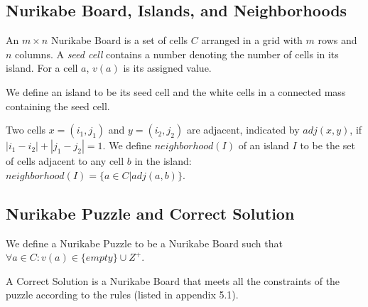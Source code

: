 \documentclass{article}
\theoremstyle{definition}
\begin{document}
\subsection{Nurikabe Board, Islands, and Neighborhoods}
An $m \times n$ Nurikabe Board is a set of cells $C$ arranged in a grid with $m$ rows and $n$ columns. A \textit{seed cell} contains a number denoting the number of cells in its island. For a cell $a$, $v(a)$ is its assigned value.

We define an island to be its seed cell and the white cells in a connected mass containing the seed cell.

Two cells $x=(i_1, j_1)$ and $y=(i_2, j_2)$ are adjacent, indicated by $adj(x, y)$, if $|i_1-i_2|+|j_1-j_2|=1$. We define $neighborhood(I)$ of an island $I$ to be the set of cells adjacent to any cell $b$ in the island:
$neighborhood(I)= \{ a \in C | adj(a, b) \}$.

\subsection{Nurikabe Puzzle and Correct Solution}
We define a Nurikabe Puzzle to be a Nurikabe Board such that $\forall a\in C : v(a) \in \{ empty \} \cup Z^{+}$. 

A Correct Solution is a Nurikabe Board that meets all the constraints of the puzzle according to the rules (listed in appendix 5.1).
\end{document}
